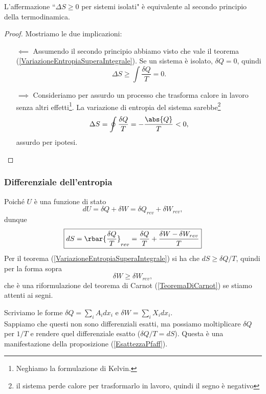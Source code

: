 \begin{proposition}
L'affermazione ``$\Delta S\geq 0$ per sistemi isolati" \`e equivalente al secondo principio della termodinamica.
\end{proposition}
\begin{proof}
Mostriamo le due implicazioni:
\setlength{\leftmargini}{0cm}
\begin{itemize}
\item[$\boxed{\impliedby}$] Assumendo il secondo principio abbiamo visto che vale il teorema (\ref{VariazioneEntropiaSuperaIntegrale}). Se un sistema \`e isolato, $\delta Q=0$, quindi 
\[\Delta S\geq \int \frac{\delta Q}T=0.\]
\item[$\boxed{\implies}$] Consideriamo per assurdo un processo che trasforma calore in lavoro senza altri effetti\footnote{Neghiamo la formulazione di Kelvin.}. 
La variazione di entropia del sistema sarebbe\footnote{il sistema perde calore per trasformarlo in lavoro, quindi il segno \`e negativo} 
\[\Delta S=\oint \frac{\delta Q}T=-\frac{\abs{Q}}T<0,\]
assurdo per ipotesi.
\end{itemize}
\setlength{\leftmargini}{0.5cm}


\end{proof}

\subsubsection{Differenziale dell'entropia}
\begin{remark}
Poich\'e $U$ \`e una funzione di stato
\[dU=\delta Q+\delta W=\delta Q_{rev}+\delta W_{rev},\]
dunque
\[\boxed{dS=\rbar{\frac{\delta Q}T}_{rev}=\frac{\delta Q}T+\frac{\delta W-\delta W_{rev}}T}\]
Per il teorema (\ref{VariazioneEntropiaSuperaIntegrale}) si ha che $dS\geq \delta Q/T$, quindi per la forma sopra
\[\delta W\geq \delta W_{rev},\]
che \`e una riformulazione del teorema di Carnot (\ref{TeoremaDiCarnot}) se stiamo attenti ai segni.
\end{remark}

\begin{remark}
Scriviamo le forme $\delta Q=\sum_i A_idx_i$ e $\delta W=\sum_i X_idx_i$.\\
Sappiamo che questi non sono differenziali esatti, ma possiamo moltiplicare $\delta Q$ per $1/T$ e rendere quel differenziale esatto ($\delta Q/T=dS$). Questa \`e una manifestazione della proposizione (\ref{EsattezzaPfaff}).
\end{remark} 

